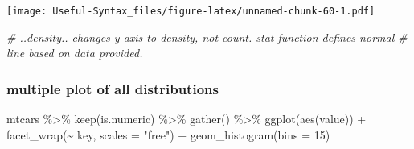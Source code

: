 \documentclass[
]{article}
\newenvironment{Shaded}{\begin{snugshade}}{\end{snugshade}}
\newcommand{\AttributeTok}[1]{\textcolor[rgb]{0.77,0.63,0.00}{#1}}
\newcommand{\CommentTok}[1]{\textcolor[rgb]{0.56,0.35,0.01}{\textit{#1}}}
\newcommand{\DecValTok}[1]{\textcolor[rgb]{0.00,0.00,0.81}{#1}}
\newcommand{\FunctionTok}[1]{\textcolor[rgb]{0.00,0.00,0.00}{#1}}
\newcommand{\NormalTok}[1]{#1}
\newcommand{\OtherTok}[1]{\textcolor[rgb]{0.56,0.35,0.01}{#1}}
\newcommand{\SpecialCharTok}[1]{\textcolor[rgb]{0.00,0.00,0.00}{#1}}
\newcommand{\StringTok}[1]{\textcolor[rgb]{0.31,0.60,0.02}{#1}}
\begin{document}
\begin{Shaded}
\end{Shaded}

\texttt{[image: Useful-Syntax\_files/figure-latex/unnamed-chunk-60-1.pdf]}

\begin{Shaded}
\begin{Highlighting}[]
\CommentTok{\# ..density.. changes y axis to density, not count. stat function defines normal}
\CommentTok{\# line based on data provided.}
\end{Highlighting}
\end{Shaded}

\hypertarget{multiple-plot-of-all-distributions}{%
\subsubsection{multiple plot of all distributions}\label{multiple-plot-of-all-distributions}}

\begin{Shaded}
\begin{Highlighting}[]
\NormalTok{mtcars }\SpecialCharTok{\%\textgreater{}\%} \FunctionTok{keep}\NormalTok{(is.numeric) }\SpecialCharTok{\%\textgreater{}\%} \FunctionTok{gather}\NormalTok{() }\SpecialCharTok{\%\textgreater{}\%} \FunctionTok{ggplot}\NormalTok{(}\FunctionTok{aes}\NormalTok{(value)) }\SpecialCharTok{+}
  \FunctionTok{facet\_wrap}\NormalTok{(}\SpecialCharTok{\textasciitilde{}}\NormalTok{ key, }\AttributeTok{scales =} \StringTok{"free"}\NormalTok{) }\SpecialCharTok{+} \FunctionTok{geom\_histogram}\NormalTok{(}\AttributeTok{bins =} \DecValTok{15}\NormalTok{)}
\end{Highlighting}
\end{Shaded}
\end{document}
